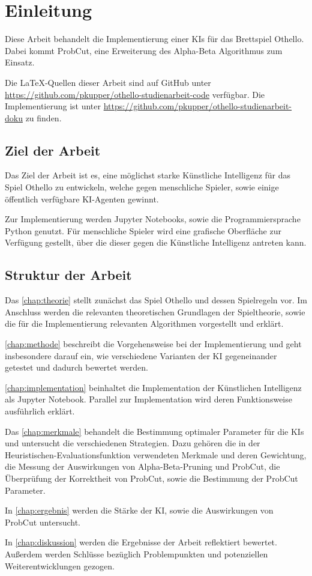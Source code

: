 
\chapter{Einleitung}
\label{chap:einleitung}

Diese Arbeit behandelt die Implementierung einer \acp{KI} für das Brettspiel Othello. Dabei kommt
ProbCut\cite[S.~1]{probcut}, eine Erweiterung des Alpha-Beta Algorithmus zum Einsatz.

Die \LaTeX-Quellen dieser Arbeit sind auf GitHub unter \url{https://github.com/pkupper/othello-studienarbeit-code}
verfügbar. Die Implementierung ist unter \url{https://github.com/pkupper/othello-studienarbeit-doku} zu finden.

\section{Ziel der Arbeit}
\label{sec:goal}

Das Ziel der Arbeit ist es, eine möglichst starke Künstliche Intelligenz für das Spiel Othello zu entwickeln, welche
gegen menschliche Spieler, sowie einige öffentlich verfügbare KI-Agenten gewinnt.

Zur Implementierung werden Jupyter Notebooks, sowie die Programmiersprache Python genutzt.
Für menschliche Spieler wird eine grafische Oberfläche zur Verfügung gestellt, über
die dieser gegen die Künstliche Intelligenz antreten kann.

\section{Struktur der Arbeit}
Das \autoref{chap:theorie} stellt zunächst das Spiel Othello und dessen Spielregeln vor. Im Anschluss werden die
relevanten theoretischen Grundlagen der Spieltheorie, sowie die für die Implementierung relevanten Algorithmen
vorgestellt und erklärt.

\autoref{chap:methode} beschreibt die Vorgehensweise bei der Implementierung und geht insbesondere darauf ein, wie
verschiedene Varianten der KI gegeneinander getestet und dadurch bewertet werden.

\autoref{chap:implementation} beinhaltet die Implementation der Künstlichen Intelligenz als Jupyter Notebook. Parallel
zur Implementation wird deren Funktionsweise ausführlich erklärt.

Das \autoref{chap:merkmale} behandelt die Bestimmung optimaler Parameter für die \acp{KI} und untersucht die
verschiedenen Strategien. Dazu gehören die in der Heuristischen-Evaluationsfunktion verwendeten Merkmale und deren
Gewichtung, die Messung der Auswirkungen von Alpha-Beta-Pruning und ProbCut, die Überprüfung der Korrektheit von
ProbCut, sowie die Bestimmung der ProbCut Parameter.

In \autoref{chap:ergebnis} werden die Stärke der KI, sowie die Auswirkungen von ProbCut untersucht.

In \autoref{chap:diskussion} werden die Ergebnisse der Arbeit reflektiert bewertet. Außerdem werden Schlüsse bezüglich
Problempunkten und potenziellen Weiterentwicklungen gezogen.